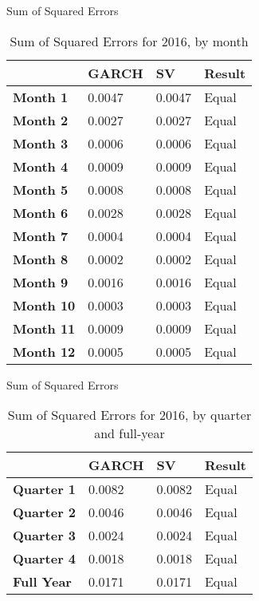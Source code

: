 \documentclass[11pt]{beamer}
\begin{document}
\begin{frame}{Sum of Squared Errors}
\begin{table}[!ht]
    \centering
    \begin{tabular}{|l|l|l|l|}
    \hline
        ~ & \textbf{GARCH} & \textbf{SV} & \textbf{Result} \\ \hline
        \textbf{Month 1 }& 0.0047 & 0.0047 & Equal \\ \hline
        \textbf{Month 2} & 0.0027 & 0.0027 & Equal \\ \hline
        \textbf{Month 3} & 0.0006 & 0.0006 & Equal \\ \hline
        \textbf{Month 4} & 0.0009 & 0.0009 & Equal \\ \hline
       \textbf{Month 5} & 0.0008 & 0.0008 & Equal \\ \hline
       \textbf{Month 6} & 0.0028 & 0.0028 & Equal \\ \hline
        \textbf{Month 7} & 0.0004 & 0.0004 & Equal \\ \hline
        \textbf{Month 8} & 0.0002 & 0.0002 & Equal \\ \hline
        \textbf{Month 9} & 0.0016 & 0.0016 & Equal \\ \hline
        \textbf{Month 10} & 0.0003 & 0.0003 & Equal \\ \hline
        \textbf{Month 11} & 0.0009 & 0.0009 & Equal \\ \hline
        \textbf{Month 12} & 0.0005 & 0.0005 & Equal \\ \hline
        
    \end{tabular}
\caption{Sum of Squared Errors for 2016, by month}
\end{table}

\end{frame}

\begin{frame}{Sum of Squared Errors}
\begin{table}[!ht]
    \centering
    \begin{tabular}{|l|l|l|l|}
    \hline
        ~ & \textbf{GARCH} & \textbf{SV} & \textbf{Result} \\ \hline
        \textbf{Quarter 1} & 0.0082 & 0.0082 & Equal \\ \hline
        \textbf{Quarter 2} & 0.0046 & 0.0046 & Equal \\ \hline
        \textbf{Quarter 3} & 0.0024 & 0.0024 & Equal \\ \hline
        \textbf{Quarter 4} & 0.0018 & 0.0018 & Equal \\ \hline
        \textbf{Full Year} & 0.0171 & 0.0171 & Equal \\ \hline
    \end{tabular}
\caption{Sum of Squared Errors for 2016, by quarter and full-year}
\end{table}
\end{frame}
\end{document}
